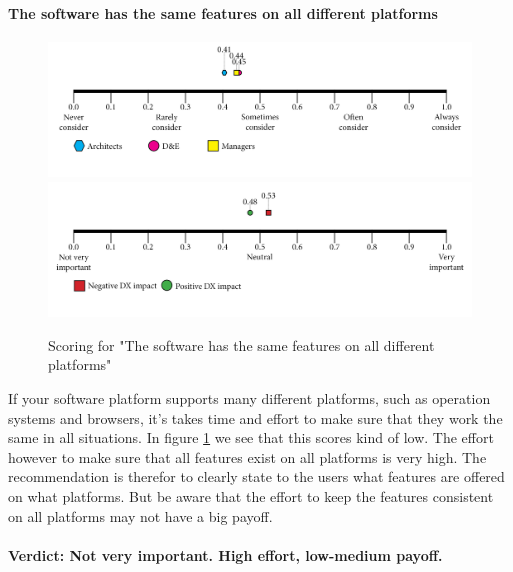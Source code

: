 \documentclass{article}
\begin{document}
\paragraph{The software has the same features on all different platforms}
\begin{figure}[H]
\centering
\includegraphics[width=\linewidth]{scorelines/aspect11.png}
\includegraphics[width=\linewidth]{dxscorelines/dxaspect11.png}
\caption{Scoring for "The software has the same features on all different platforms"}
\label{fig:aspect11}
\end{figure}
If your software platform supports many different platforms, such as operation systems and browsers, it's takes time and effort to make sure that they work the same in all situations. In figure \ref{fig:aspect11} we see that this scores kind of low. The effort however to make sure that all features exist on all platforms is very high. The recommendation is therefor to clearly state to the users what features are offered on what platforms. But be aware that the effort to keep the features consistent on all platforms may not have a big payoff. \\ \\
\textbf{Verdict: Not very important. High effort, low-medium payoff.}
\end{document}
